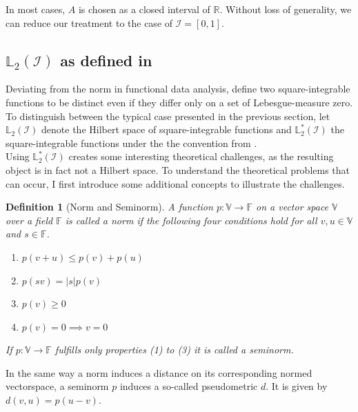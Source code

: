 \documentclass[12pt, a4paper]{article}
\theoremstyle{MAstyle} \newtheorem{assumption}{Assumption}[section]
\theoremstyle{MAstyle} \newtheorem{definition}{Definition}[section]
\begin{document}
			In most cases, $A$ is chosen as a closed interval of $\mathbb{R}$. Without loss of generality, we can reduce our treatment to the case of $\mathcal{I} = [0,1]$.
			
			\subsection{$\mathbb{L}_2(\mathcal{I})$ as defined in \cite{bugni_permutation_2021}}
			Deviating from the norm in functional data analysis, \cite{bugni_permutation_2021} define two square-integrable functions to be distinct even if they differ only on a set of Lebesgue-measure zero. To distinguish between the typical case presented in the previous section, let $\mathbb{L}_2(\mathcal{I})$ denote the Hilbert space of square-integrable functions and $\mathbb{L}^{*}_2(\mathcal{I})$ the square-integrable functions under the the convention from \cite{bugni_permutation_2021}.\\
			
			Using $\mathbb{L}^{*}_2(\mathcal{I})$ creates some interesting theoretical challenges, as the resulting object is in fact not a Hilbert space. To understand the theoretical problems that can occur, I first introduce some additional concepts to illustrate the challenges.
			\begin{definition}[Norm and Seminorm]
				A function $p : \mathbb{V} \rightarrow \mathbb{F}$ on a vector space $\mathbb{V}$ over a field $\mathbb{F}$ is called a norm if the following four conditions hold for all $v,u \in \mathbb{V}$ and $s \in \mathbb{F}$.
				\begin{multicols}{2}
					\begin{enumerate}
						\item $p(v + u) \leq p(v) + p(u)$
						\item $p(sv) = |s| p(v)$
						\item $p(v) \geq 0$
						\item $p(v) = 0 \implies v = 0$
					\end{enumerate}
				\end{multicols}
				If $p : \mathbb{V} \rightarrow \mathbb{F}$ fulfills only properties (1) to (3) it is called a seminorm.
			\end{definition}
			
			In the same way a norm induces a distance on its corresponding normed vectorspace, a seminorm $p$ induces a so-called pseudometric $d$. It is given by $d(v,u) = p(u-v)$.
			
\end{document}
